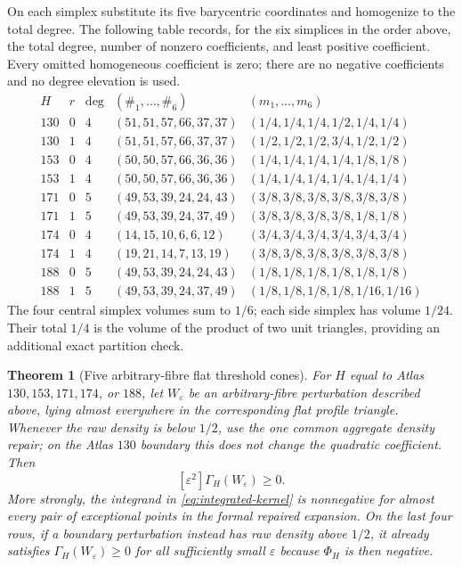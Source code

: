 \documentclass[11pt]{article}
\newtheorem{theorem}{Theorem}[section]
\begin{document}
On each simplex substitute its five barycentric coordinates and homogenize
to the total degree.  The following table records, for the six simplices in
the order above, the total degree, number of nonzero coefficients, and least
positive coefficient.  Every omitted homogeneous coefficient is zero; there
are no negative coefficients and no degree elevation is used.
\[
\begin{array}{c|c|c|c|c}
H&r&\deg&(\#_1,\ldots,\#_6)&(m_1,\ldots,m_6)\\ \hline
130&0&4&(51,51,57,66,37,37)&(1/4,1/4,1/4,1/2,1/4,1/4)\\
130&1&4&(51,51,57,66,37,37)&(1/2,1/2,1/2,3/4,1/2,1/2)\\
153&0&4&(50,50,57,66,36,36)&(1/4,1/4,1/4,1/4,1/8,1/8)\\
153&1&4&(50,50,57,66,36,36)&(1/4,1/4,1/4,1/4,1/4,1/4)\\
171&0&5&(49,53,39,24,24,43)&(3/8,3/8,3/8,3/8,3/8,3/8)\\
171&1&5&(49,53,39,24,37,49)&(3/8,3/8,3/8,3/8,1/8,1/8)\\
174&0&4&(14,15,10,6,6,12)&(3/4,3/4,3/4,3/4,3/4,3/4)\\
174&1&4&(19,21,14,7,13,19)&(3/8,3/8,3/8,3/8,3/8,3/8)\\
188&0&5&(49,53,39,24,24,43)&(1/8,1/8,1/8,1/8,1/8,1/8)\\
188&1&5&(49,53,39,24,37,49)&(1/8,1/8,1/8,1/8,1/16,1/16)
\end{array}
\]
The four central simplex volumes sum to $1/6$; each side simplex has volume
$1/24$.  Their total $1/4$ is the volume of the product of two unit
triangles, providing an additional exact partition check.

\begin{theorem}[Five arbitrary-fibre flat threshold cones]
For $H$ equal to Atlas $130,153,171,174$, or $188$, let
$W_\varepsilon$ be an arbitrary-fibre perturbation described above, lying
almost everywhere in the corresponding flat profile triangle.  Whenever the
raw density is below $1/2$, use the one common aggregate density repair; on
the Atlas $130$ boundary this does not change the quadratic coefficient.
Then
\[
 [\varepsilon^2]\Gamma_H(W_\varepsilon)\geq0.
\]
More strongly, the integrand in \eqref{eq:integrated-kernel} is nonnegative
for almost every pair of exceptional points in the formal repaired
expansion.  On the last four rows, if a boundary perturbation instead has raw
density above $1/2$, it already satisfies $\Gamma_H(W_\varepsilon)\geq0$ for
all sufficiently small $\varepsilon$ because $\Phi_H$ is then negative.
\end{theorem}
\end{document}
